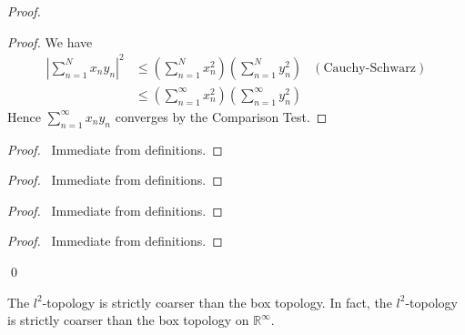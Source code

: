 \begin{proof}
  \pf
  \begin{proof}
    \pf
    We have
    \begin{align*}
      \left| \sum_{n=1}^N x_n y_n \right|^2 & \leq \left( \sum_{n=1}^N x_n^2 \right) \left( \sum_{n=1}^N y_n^2 \right) & (\text{Cauchy-Schwarz})\\
      & \leq \left( \sum_{n=1}^\infty x_n^2 \right) \left( \sum_{n=1}^\infty y_n^2 \right)
    \end{align*}
    Hence $\sum_{n=1}^\infty x_n y_n$ converges by the Comparison Test.
  \end{proof}
  \begin{proof}
    \pf\ Immediate from definitions.
  \end{proof}
  \begin{proof}
    \pf\ Immediate from definitions.
  \end{proof}
  \begin{proof}
    \pf\ Immediate from definitions.
  \end{proof}
  \begin{proof}
    \pf\ Immediate from definitions.
  \end{proof}
  \qed
\end{proof}

\begin{prop}
  The $l^2$-topology is strictly coarser than the box topology. In fact, the $l^2$-topology is strictly coarser than the box topology on $\mathbb{R}^\infty$.
\end{prop}

